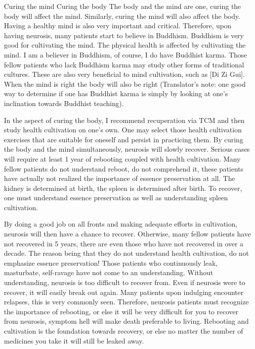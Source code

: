 \documentclass[
]{book}
\begin{document}
Curing the mind
Curing the body
The body and the mind are one, curing the body will affect the mind. Similarly, curing the mind will also affect the body. Having a healthy mind is also very important and critical. Therefore, upon having neurosis, many patients start to believe in Buddhism. Buddhism is very good for cultivating the mind. The physical health is affected by cultivating the mind. I am a believer in Buddhism, of course, I do have Buddhist karma. Those fellow patients who lack Buddhism karma may study other forms of traditional cultures. These are also very beneficial to mind cultivation, such as {[}Di Zi Gui{]}. When the mind is right the body will also be right (Translator's note: one good way to determine if one has Buddhist karma is simply by looking at one's inclination towards Buddhist teaching).

In the aspect of curing the body, I recommend recuperation via TCM and then study health cultivation on one's own. One may select those health cultivation exercises that are suitable for oneself and persist in practicing them. By curing the body and the mind simultaneously, neurosis will slowly recover. Serious cases will require at least 1 year of rebooting coupled with health cultivation. Many fellow patients do not understand reboot, do not comprehend it, these patients have actually not realized the importance of essence preservation at all. The kidney is determined at birth, the spleen is determined after birth. To recover, one must understand essence preservation as well as understanding spleen cultivation.

By doing a good job on all fronts and making adequate efforts in cultivation, neurosis will then have a chance to recover. Otherwise, many fellow patients have not recovered in 5 years, there are even those who have not recovered in over a decade. The reason being that they do not understand health cultivation, do not emphasize essence preservation! Those patients who continuously leak, masturbate, self-ravage have not come to an understanding. Without understanding, neurosis is too difficult to recover from. Even if neurosis were to recover, it will easily break out again. Many patients upon indulging encounter relapses, this is very commonly seen. Therefore, neurosis patients must recognize the importance of rebooting, or else it will be very difficult for you to recover from neurosis, symptom hell will make death preferable to living. Rebooting and cultivation is the foundation towards recovery, or else no matter the number of medicines you take it will still be leaked away.
\end{document}
